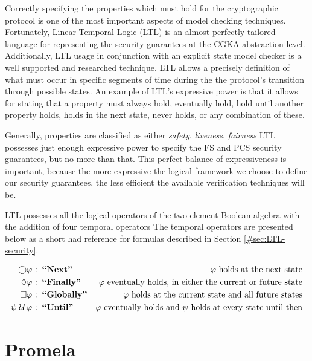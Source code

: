 Correctly specifying the properties which must hold for the cryptographic protocol is one of the most important aspects of model checking techniques.
Fortunately, Linear Temporal Logic (LTL) \autocite{4567924} is an almost perfectly tailored language for representing the security guarantees at the CGKA abstraction level.
Additionally, LTL usage in conjunction with an explicit state model checker is a well supported and researched technique.
LTL allows a precisely definition of what must occur in specific segments of time during the the protocol's transition through possible states.
An example of LTL's expressive power is that it allows for stating that a property must always hold, eventually hold, hold until another property holds, holds in the next state, never holds, or any combination of these.

Generally, properties are classified as either \emph{safety}, \emph{liveness}, \emph{fairness}
LTL possesses just enough expressive power to specify the FS and PCS security guarantees, but no more than that.
This perfect balance of expressiveness is important, because the more expressive the logical framework we choose to define our security guarantees, the less efficient the available verification techniques will be.

LTL possesses all the logical operators of the two-element Boolean algebra with the addition of four temporal operators
The temporal operators are presented below as a short had reference for formulas described in Section \ref{#sec:LTL-security}.

\[
\begin{aligned}[t]
                 \bigcirc & \varphi & \!\!\!\!\textrm{:} & \;\;\textbf{``Next''}     & \varphi\textrm{ holds at the next state} \hfill &\\
                 \Diamond & \varphi & \!\!\!\!\textrm{:} & \;\;\textbf{``Finally''}  & \varphi\textrm{ eventually holds, in either the current or future state} \hfill &\\
                 \Box     & \varphi & \!\!\!\!\textrm{:} & \;\;\textbf{``Globally''} & \varphi\textrm{ holds at the current state and all future states} \hfill &\\
  \psi \;{\mathcal {U}}\, & \varphi & \!\!\!\!\textrm{:} & \;\;\textbf{``Until''}    & \varphi\textrm{ eventually holds and $\psi$ holds at every state until then} \hfill &\\
\end{aligned}
\]

\hypertarget{promela}{%
\section{Promela}\label{promela}}

